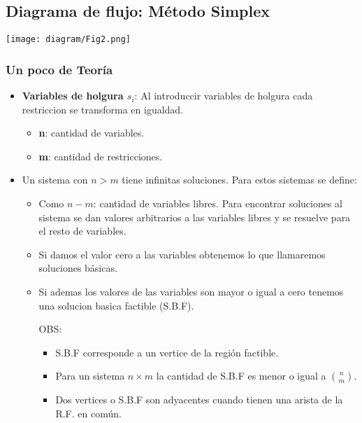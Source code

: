 \documentclass{templateNote}
\begin{document}
\subsection{Diagrama de flujo: Método Simplex}
\begin{center}
    \centering
    \texttt{[image: diagram/Fig2.png]}
\end{center}

\subsubsection*{Un poco de Teoría}
\begin{itemize}
    \item \textbf{Variables de holgura $s_i$}: Al introduccir variables de holgura cada restriccion se transforma en igualdad.
    \begin{itemize}
        \item \textbf{n}: cantidad de variables.
        \item \textbf{m}: cantidad de restricciones.
    \end{itemize}

    \item Un sistema con $n>m$ tiene infinitas soluciones.
    Para estos sistemas se define:
    \begin{itemize}
        \item Como $n-m$: cantidad de variables libres. Para encontrar soluciones al sistema se dan valores arbitrarios a las variables libres y se resuelve para el resto de variables.
        
        \item Si damos el valor cero a las variables obtenemos lo que llamaremos soluciones básicas.
        
        \item Si ademas los valores de las variables son mayor o igual a cero tenemos una solucion basica factible (S.B.F).
        
        OBS:
        \begin{itemize}
            \item S.B.F corresponde a un vertice de la región factible.
            \item Para un sistema $n \times m$ la cantidad de S.B.F es menor o igual a $\binom{n}{m} $.
            \item Dos vertices o S.B.F son adyacentes cuando tienen una arista de la R.F. en común.
        \end{itemize}
    \end{itemize}
\end{itemize}
\newpage
\end{document}
